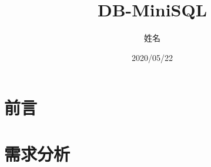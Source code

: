 \documentclass[UTF8]{ctexart}
\title{\huge{DB-MiniSQL}}
\author{姓名}
\date{2020/05/22}
\begin{document}
\maketitle

\tableofcontents

\clearpage
\section{前言}



\clearpage
\section{需求分析}
\end{document}
